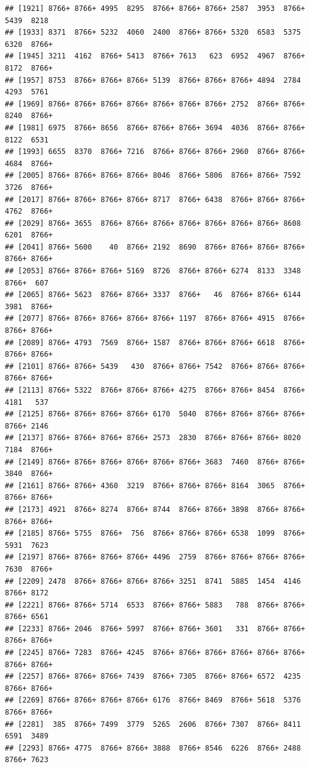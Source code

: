 \documentclass[
]{book}
\begin{document}
\begin{verbatim}
## [1921] 8766+ 8766+ 4995  8295  8766+ 8766+ 8766+ 2587  3953  8766+ 5439  8218 
## [1933] 8371  8766+ 5232  4060  2400  8766+ 8766+ 5320  6583  5375  6320  8766+
## [1945] 3211  4162  8766+ 5413  8766+ 7613   623  6952  4967  8766+ 8172  8766+
## [1957] 8753  8766+ 8766+ 8766+ 5139  8766+ 8766+ 8766+ 4894  2784  4293  5761 
## [1969] 8766+ 8766+ 8766+ 8766+ 8766+ 8766+ 8766+ 2752  8766+ 8766+ 8240  8766+
## [1981] 6975  8766+ 8656  8766+ 8766+ 8766+ 3694  4036  8766+ 8766+ 8122  6531 
## [1993] 6655  8370  8766+ 7216  8766+ 8766+ 8766+ 2960  8766+ 8766+ 4684  8766+
## [2005] 8766+ 8766+ 8766+ 8766+ 8046  8766+ 5806  8766+ 8766+ 7592  3726  8766+
## [2017] 8766+ 8766+ 8766+ 8766+ 8717  8766+ 6438  8766+ 8766+ 8766+ 4762  8766+
## [2029] 8766+ 3655  8766+ 8766+ 8766+ 8766+ 8766+ 8766+ 8766+ 8608  6201  8766+
## [2041] 8766+ 5600    40  8766+ 2192  8690  8766+ 8766+ 8766+ 8766+ 8766+ 8766+
## [2053] 8766+ 8766+ 8766+ 5169  8726  8766+ 8766+ 6274  8133  3348  8766+  607 
## [2065] 8766+ 5623  8766+ 8766+ 3337  8766+   46  8766+ 8766+ 6144  3981  8766+
## [2077] 8766+ 8766+ 8766+ 8766+ 8766+ 1197  8766+ 8766+ 4915  8766+ 8766+ 8766+
## [2089] 8766+ 4793  7569  8766+ 1587  8766+ 8766+ 8766+ 6618  8766+ 8766+ 8766+
## [2101] 8766+ 8766+ 5439   430  8766+ 8766+ 7542  8766+ 8766+ 8766+ 8766+ 8766+
## [2113] 8766+ 5322  8766+ 8766+ 8766+ 4275  8766+ 8766+ 8454  8766+ 4181   537 
## [2125] 8766+ 8766+ 8766+ 8766+ 6170  5040  8766+ 8766+ 8766+ 8766+ 8766+ 2146 
## [2137] 8766+ 8766+ 8766+ 8766+ 2573  2830  8766+ 8766+ 8766+ 8020  7184  8766+
## [2149] 8766+ 8766+ 8766+ 8766+ 8766+ 8766+ 3683  7460  8766+ 8766+ 3840  8766+
## [2161] 8766+ 8766+ 4360  3219  8766+ 8766+ 8766+ 8164  3065  8766+ 8766+ 8766+
## [2173] 4921  8766+ 8274  8766+ 8744  8766+ 8766+ 3898  8766+ 8766+ 8766+ 8766+
## [2185] 8766+ 5755  8766+  756  8766+ 8766+ 8766+ 6538  1099  8766+ 5931  7623 
## [2197] 8766+ 8766+ 8766+ 8766+ 4496  2759  8766+ 8766+ 8766+ 8766+ 7630  8766+
## [2209] 2478  8766+ 8766+ 8766+ 8766+ 3251  8741  5885  1454  4146  8766+ 8172 
## [2221] 8766+ 8766+ 5714  6533  8766+ 8766+ 5883   788  8766+ 8766+ 8766+ 6561 
## [2233] 8766+ 2046  8766+ 5997  8766+ 8766+ 3601   331  8766+ 8766+ 8766+ 8766+
## [2245] 8766+ 7283  8766+ 4245  8766+ 8766+ 8766+ 8766+ 8766+ 8766+ 8766+ 8766+
## [2257] 8766+ 8766+ 8766+ 7439  8766+ 7305  8766+ 8766+ 6572  4235  8766+ 8766+
## [2269] 8766+ 8766+ 8766+ 8766+ 6176  8766+ 8469  8766+ 5618  5376  8766+ 8766+
## [2281]  385  8766+ 7499  3779  5265  2606  8766+ 7307  8766+ 8411  6591  3489 
## [2293] 8766+ 4775  8766+ 8766+ 3888  8766+ 8546  6226  8766+ 2488  8766+ 7623 

\end{verbatim}
\end{document}
